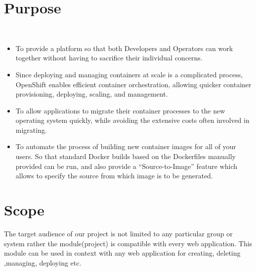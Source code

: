 \documentclass[11pt]{report}
\begin{document}
	\section{Purpose}
	\
	\
	\begin{itemize}
		\large
		\item To provide a platform so that both Developers and Operators can work together without having to sacrifice their individual concerns.
		\vspace{0.3cm}
		\item Since deploying and managing containers at scale is a complicated process, OpenShift enables efficient container orchestration, allowing quicker container provisioning, deploying, scaling, and management.
		\vspace{0.3cm}
		\item To allow applications to migrate their container processes to the new operating system quickly, while avoiding the extensive costs often involved in migrating.
		\vspace{0.3cm}
		\item To automate the process of building new container images for all of your users. So that standard Docker builds based on the Dockerfiles manually provided can be run, and also provide a “Source-to-Image” feature which allows to specify the source from which image is to be generated.
		\large
	\end{itemize}
	\large
	\section{Scope}
	\large
	The target audience of our project is not limited to any particular group or system rather the
	module(project) is compatible with every web application. This
	module can be used in context with any web application for creating, deleting ,managing, deploying etc.
	\pagebreak
	\LARGE
	
\end{document}
